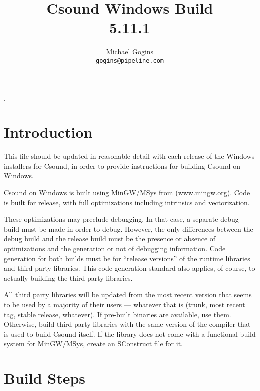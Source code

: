 \documentclass[11pt,letterpaper,onecolumn]{scrartcl}
\begin{document}
\begin{sloppypar}

.
\title{Csound Windows Build \\ 5.11.1}

\author{Michael Gogins \\ \texttt{gogins@pipeline.com}}
\maketitle

\section{Introduction}
\label{sec:Introduction}

This file should be updated in reasonable detail with each release of the Windows installers for Csound, in order to provide instructions for building Csound on Windows.

Csound on Windows is built using MinGW/MSys from (\url{www.mingw.org}). Code is built for release, with full optimizations including intrinsics and vectorization.  

These optimizations may preclude debugging. In that case, a separate debug build must be made in order to debug. However, the only differences between the debug build and the release build must be the presence or absence of optimizations and the generation or not of debugging information. Code generation for both builds must be for ``release versions'' of the runtime libraries and third party libraries. This code generation standard also applies, of course, to actually building the third party libraries.

All third party libraries will be updated from the most recent version that seems to be used by a majority of their users --- whatever that is (trunk, most recent tag, stable release, whatever). If pre-built binaries are available, use them. Otherwise, build third party libraries with the same version of the compiler that is used to build Csound itself. If the library does not come with a functional build system for MinGW/MSys, create an SConstruct file for it.

\section{Build Steps}
\label{sec:BuildSteps}


\end{sloppypar}
\end{document}
